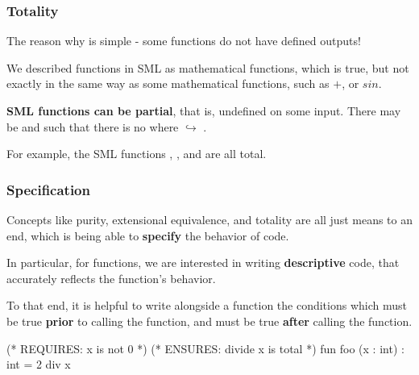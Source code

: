 \documentclass[aspectratio=169]{beamer}
\begin{document}
\begin{frame}[fragile]
  \frametitle{Totality}

  The reason why is simple - some functions do not have defined outputs!

  \pause
  \vspace{\fill}

  We described functions in SML as mathematical functions, which is true, but not exactly in the
  same way as some mathematical functions, such as $+$, or $sin$.

  \pause
  \vspace{5pt}

  \textbf{SML functions can be partial}, that is, undefined on some input. There may be 
  and  such that there is no  where  $\hookrightarrow$ .

  \pause
  \vspace{\fill}


  \vspace{5pt}

  For example, the SML functions \code{+}, , and \code{^} are all total.
\end{frame}

\begin{frame}[fragile]
  \frametitle{Specification}

  Concepts like purity, extensional equivalence, and totality are all just means to
  an end, which is being able to \textbf{specify} the behavior of code.

  \pause
  \vspace{\fill}

  In particular, for functions, we are interested in writing \textbf{descriptive} code,
  that accurately reflects the function's behavior.

  \pause
  \vspace{5pt}

  To that end, it is helpful to write alongside a function the conditions which
  must be true \textbf{prior} to calling the function, and must be true \textbf{after}
  calling the function.

  \pause
  \vspace{\fill}

  \begin{codeblock}
    (* REQUIRES: x is not 0 *)
    (* ENSURES: divide x is total *)
    fun foo (x : int) : int = 2 div x
  \end{codeblock}
\end{frame}
\end{document}
